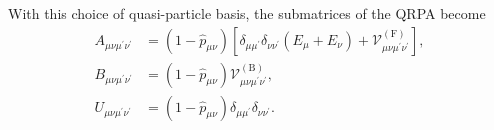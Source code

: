 With this choice of quasi-particle basis, the submatrices of the QRPA become
\begin{align}
    A_{\mu \nu \mu^{\prime} \nu^{\prime}} &= \left(1-\hat{p}_{\mu \nu}\right)\left[\delta_{\mu \mu^{\prime}} \delta_{\nu \nu^{\prime}}\left(E_\mu+E_\nu\right)+\mathcal{V}_{\mu \nu \mu^{\prime} \nu^{\prime}}^{(\mathrm{F})}\right], \\
    B_{\mu \nu \mu^{\prime} \nu^{\prime}} &= \left(1-\hat{p}_{\mu \nu}\right) \mathcal{V}_{\mu \nu \mu^{\prime} \nu^{\prime}}^{(\mathrm{B})}, \\
    U_{\mu \nu \mu^{\prime} \nu^{\prime}} &= \left(1-\hat{p}_{\mu \nu}\right) \delta_{\mu \mu^{\prime}} \delta_{\nu \nu^{\prime}} .
\end{align}
